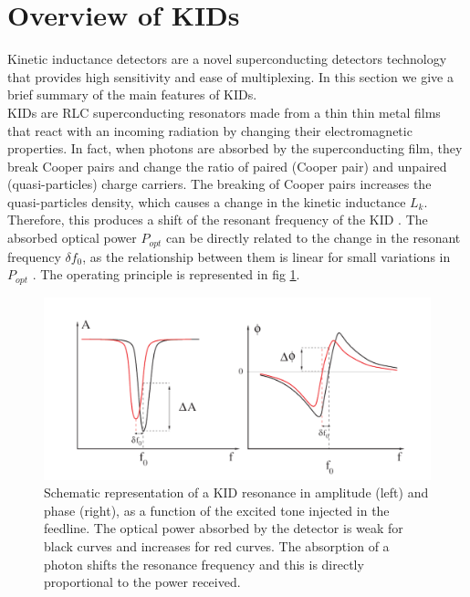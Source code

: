 \section{Overview of KIDs}
\label{sec2}

Kinetic inductance detectors are a novel superconducting detectors technology that provides high sensitivity and ease of multiplexing. In this section we give a brief summary of the main features of KIDs.\\
KIDs are RLC superconducting resonators made from a thin thin metal films that react with an incoming radiation by changing their electromagnetic properties. In fact, when photons are absorbed by the superconducting film, they break Cooper pairs and change the ratio of paired (Cooper pair) and unpaired (quasi-particles) charge carriers. The breaking of Cooper pairs increases the quasi-particles density, which causes a change in the kinetic inductance $L_{k}$. Therefore, this produces a shift of the resonant frequency of the KID \citep{2013A&A...551L..12C}. The absorbed optical power $P_{opt}$ can be directly related to the change in the resonant frequency $\delta f_{0}$, as the relationship between them is linear for small variations in $P_{opt}$ \citep{2010ApPhL..96z3511S}. The operating principle is represented in fig \ref{resonance}.\\

\begin{figure}[h]
\center
	\includegraphics[scale=0.35]{Figures/resonance.png}
	\caption{Schematic representation of a KID resonance in amplitude (left) and phase (right), as a function of the excited tone injected in the feedline. The optical power absorbed by the detector is weak for black curves and increases for red curves. The absorption of a photon shifts the resonance frequency and this is directly proportional to the power received.}
	\label{resonance}
\end{figure}

